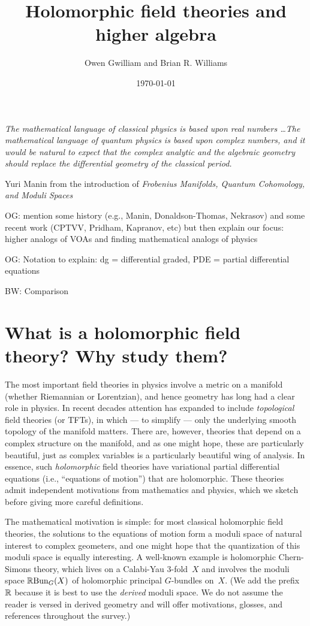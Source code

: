 \documentclass[11pt]{amsart}
\author{Owen Gwilliam and Brian R. Williams}
\date{\today}
\title{Holomorphic field theories and higher algebra}
\def\brian#1{{\textcolor{blue!75!red}{BW: {#1}}}}
\def\owen#1{{\textcolor{violet!50!black}{OG: {#1}}}}
\begin{document}

\maketitle

\epigraph{\itshape The mathematical language of classical physics is based upon real numbers \dots The mathematical language of quantum physics is based upon complex numbers, and it would be natural to expect that the complex analytic and the algebraic geometry should replace the differential geometry of the classical period.}{Yuri Manin from the introduction of {\it Frobenius Manifolds, Quantum Cohomology, and Moduli Spaces}}

\tableofcontents

\owen{mention some history (e.g., Manin, Donaldson-Thomas, Nekrasov) and some recent work (CPTVV, Pridham, Kapranov, etc) but then explain our focus: higher analogs of VOAs and finding mathematical analogs of physics}

\owen{Notation to explain: dg = differential graded, PDE = partial differential equations}

\brian{Comparison}


\section{What is a holomorphic field theory? Why study them?}

The most important field theories in physics involve a metric on a manifold (whether Riemannian or Lorentzian), and hence geometry has long had a clear role in physics.
In recent decades attention has expanded to include {\em topological} field theories (or TFTs), 
in which --- to simplify --- only the underlying smooth topology of the manifold matters.
There are, however, theories that depend on a complex structure on the manifold,
and as one might hope, these are particularly beautiful, 
just as complex variables is a particularly beautiful wing of analysis.
In essence, such {\em holomorphic} field theories have variational partial differential equations (i.e., ``equations of motion'') that are holomorphic.
These theories admit independent motivations from mathematics and physics,
which we sketch before giving more careful definitions.

The mathematical motivation is simple:
for most classical holomorphic field theories, the solutions to the equations of motion form a moduli space of natural interest to complex geometers,
and one might hope that the quantization of this moduli space is equally interesting.
A well-known example is holomorphic Chern-Simons theory,
which lives on a Calabi-Yau 3-fold~$X$ and involves the moduli space $\mathbb R{\rm Bun}_G(X)$ of holomorphic principal $G$-bundles on~$X$.
(We add the prefix $\mathbb R$ because it is best to use the {\em derived} moduli space.
We do not assume the reader is versed in derived geometry and will offer motivations, glosses, and references throughout the survey.)
\end{document}
